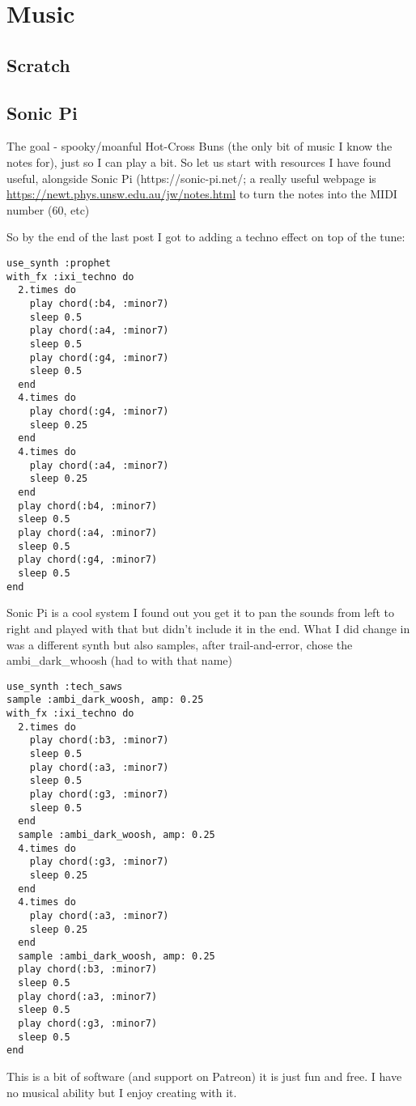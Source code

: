 \chapter{Music}
\section{Scratch}


\section{Sonic Pi}


The goal - spooky/moanful Hot-Cross Buns (the only bit of music I know the notes for), just so I can play a bit. So let us start with resources I have found useful, alongside Sonic Pi (https://sonic-pi.net/; a really useful webpage is \url{https://newt.phys.unsw.edu.au/jw/notes.html}  to turn the notes into the MIDI number (60, etc) 

So by the end of the last post I got to adding a techno effect on top of the tune:
\begin{lstlisting}
use_synth :prophet
with_fx :ixi_techno do
  2.times do
    play chord(:b4, :minor7)
    sleep 0.5
    play chord(:a4, :minor7)
    sleep 0.5
    play chord(:g4, :minor7)
    sleep 0.5
  end
  4.times do
    play chord(:g4, :minor7)
    sleep 0.25
  end
  4.times do
    play chord(:a4, :minor7)
    sleep 0.25
  end
  play chord(:b4, :minor7)
  sleep 0.5
  play chord(:a4, :minor7)
  sleep 0.5
  play chord(:g4, :minor7)
  sleep 0.5
end
\end{lstlisting}


Sonic Pi is a cool system I found out you get it to pan the sounds from left to right and played with that but didn't include it in the end. What I did change in was a different synth but also samples, after trail-and-error, chose the ambi_dark_whoosh (had to with that name)
\begin{lstlisting}
use_synth :tech_saws
sample :ambi_dark_woosh, amp: 0.25
with_fx :ixi_techno do
  2.times do
    play chord(:b3, :minor7)
    sleep 0.5
    play chord(:a3, :minor7)
    sleep 0.5
    play chord(:g3, :minor7)
    sleep 0.5
  end
  sample :ambi_dark_woosh, amp: 0.25
  4.times do
    play chord(:g3, :minor7)
    sleep 0.25
  end
  4.times do
    play chord(:a3, :minor7)
    sleep 0.25
  end
  sample :ambi_dark_woosh, amp: 0.25
  play chord(:b3, :minor7)
  sleep 0.5
  play chord(:a3, :minor7)
  sleep 0.5
  play chord(:g3, :minor7)
  sleep 0.5
end
\end{lstlisting}



This is a bit of software (and support on Patreon) it is just fun and free. I have no musical ability but I enjoy creating with it.